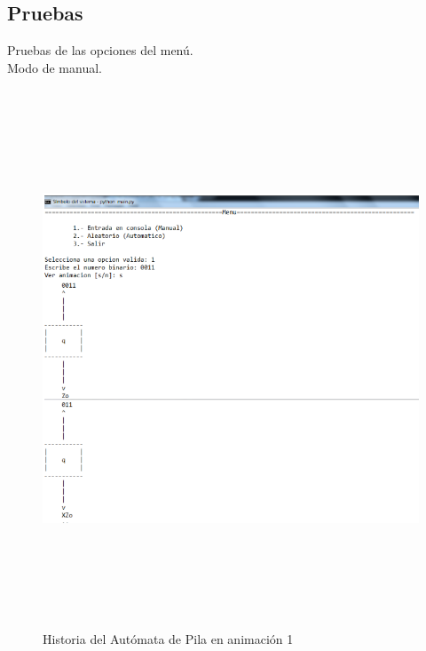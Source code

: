 	\subsection{Pruebas}
	Pruebas de las opciones del menú.
	\\
	{\large Modo de manual.}
	\begin{figure}[H]
		\begin{center}
			\includegraphics[width=14cm, height=16cm]{img/pila-manual-consola1.png}
			\caption{Historia del Autómata de Pila en animación 1}
			\label{fig:pila1a}
		\end{center}
	\end{figure}
